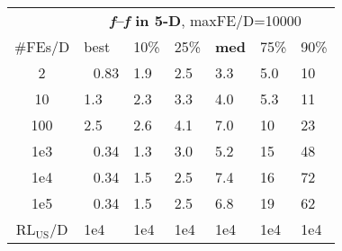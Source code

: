 \begin{tabular}{c|llllll}
 & \multicolumn{6}{|c}{\textbf{\textit{f}\raisebox{-0.35ex}{1}--\textit{f}\raisebox{-0.35ex}{24} in 5-D}, maxFE/D=10000}\\
\#FEs/D & best & 10\% & 25\% & \textbf{med} & 75\% & 90\%\\
2 & ~\,0.83 & \hspace*{1ex}1.9 & \hspace*{1ex}2.5 & \hspace*{1ex}3.3 & \hspace*{1ex}5.0 & 10\\
10 & \hspace*{1ex}1.3 & \hspace*{1ex}2.3 & \hspace*{1ex}3.3 & \hspace*{1ex}4.0 & \hspace*{1ex}5.3 & 11\\
100 & \hspace*{1ex}2.5 & \hspace*{1ex}2.6 & \hspace*{1ex}4.1 & \hspace*{1ex}7.0 & 10 & 23\\
1e3 & ~\,0.34 & \hspace*{1ex}1.3 & \hspace*{1ex}3.0 & \hspace*{1ex}5.2 & 15 & 48\\
1e4 & ~\,0.34 & \hspace*{1ex}1.5 & \hspace*{1ex}2.5 & \hspace*{1ex}7.4 & 16 & 72\\
1e5 & ~\,0.34 & \hspace*{1ex}1.5 & \hspace*{1ex}2.5 & \hspace*{1ex}6.8 & 19 & 62\\
$\text{RL}_{\text{US}}$/D & 1e4 & 1e4 & 1e4 & 1e4 & 1e4 & 1e4
\end{tabular}
